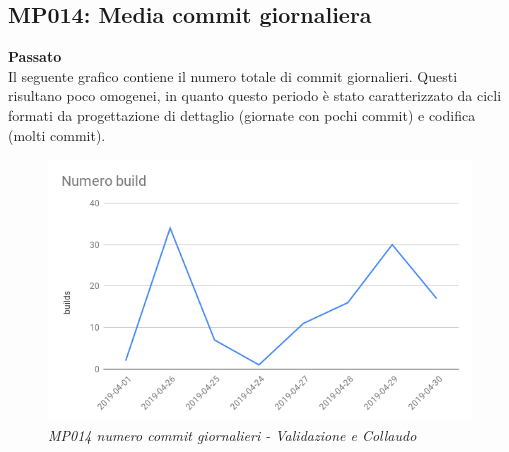\subsection{MP014: Media commit giornaliera}
\textbf{Passato}\\
Il seguente grafico contiene il numero totale di commit giornalieri. Questi risultano poco omogenei, in quanto questo periodo è stato caratterizzato da cicli formati da progettazione di dettaglio (giornate con pochi commit) e codifica (molti commit).\\
\begin{figure} [H]
    \centering
	\includegraphics[scale=0.4]{./images/RA_builds.png}
    \caption{\textit{MP014 numero commit giornalieri - Validazione e Collaudo}}
\end{figure}

